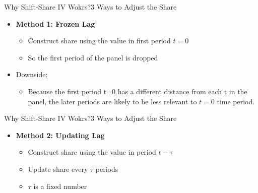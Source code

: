 \documentclass[dvipsnames,hyperref={pdfpagelabels=false}]{beamer}
\begin{document}
\begin{frame}{Why Shift-Share IV Wokrs?}{3 Ways to Adjust the Share}
	\begin{itemize}

	\item \textbf{Method 1: Frozen Lag}
			\vspace{0.2cm}
	\begin{itemize}
		\item Construct share using the value in first period $t=0$
							\vspace{0.2cm}
		\item So the first period of the panel is dropped
				\vspace{0.2cm}
				\end{itemize}		
		\item Downside:
				\vspace{0.2cm}
		\begin{itemize}
			\item Because the first period t=0 has a different distance from each t in the panel, the later periods are likely to be less relevant to $t=0$ time period.
		\end{itemize}
		
	\end{itemize}
	

\end{frame}




\begin{frame}{Why Shift-Share IV Wokrs?}{3 Ways to Adjust the Share}
	\begin{itemize}
	
	\item \textbf{Method 2: Updating Lag}
			\vspace{0.2cm}
	\begin{itemize}
		\item Construct share using the value in period $t-\tau$
		\vspace{0.2cm}
		\item Update share every $\tau$ periods
				\vspace{0.2cm}
		\item $\tau$ is a fixed number
	\end{itemize}

	\end{itemize}
\end{frame}
\end{document}
